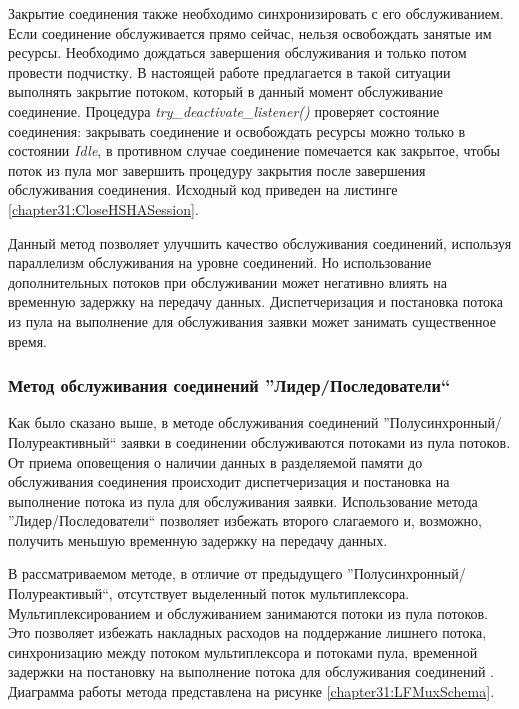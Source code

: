 Закрытие соединения также необходимо синхронизировать с его обслуживанием. Если соединение обслуживается прямо сейчас, нельзя освобождать занятые им ресурсы. Необходимо дождаться завершения обслуживания и только потом провести подчистку. В настоящей работе предлагается в такой ситуации выполнять закрытие потоком, который в данный момент обслуживание соединение. Процедура \textit{try\_deactivate\_listener()} проверяет состояние соединения: закрывать соединение и освобождать ресурсы можно только в состоянии \textit{Idle}, в противном случае соединение помечается как закрытое, чтобы поток из пула мог завершить процедуру закрытия после завершения обслуживания соединения. Исходный код приведен на листинге \ref{chapter31:CloseHSHASession}.

Данный метод позволяет улучшить качество обслуживания соединений, используя параллелизм обслуживания на уровне соединений. Но использование дополнительных потоков при обслуживании может негативно влиять на временную задержку на передачу данных. Диспетчеризация и постановка потока из пула на выполнение для обслуживания заявки может занимать существенное время.

\subsubsection{Метод обслуживания соединений ''Лидер/Последователи``}\label{chapter31:BlockingLF}

Как было сказано выше, в методе обслуживания соединений ''Полусинхронный/Полуреактивный`` заявки в соединении обслуживаются потоками из пула потоков. От приема оповещения о наличии данных в разделяемой памяти до обслуживания соединения происходит диспетчеризация и постановка на выполнение потока из пула для обслуживания заявки. Использование метода ''Лидер/Последователи`` \cite{schmidt1998leader} позволяет избежать второго слагаемого и, возможно, получить меньшую временную задержку на передачу данных.

В рассматриваемом методе, в отличие от предыдущего ''Полусинхронный/Полуреактивый``, отсутствует выделенный поток мультиплексора. Мультиплексированием и обслуживанием занимаются потоки из пула потоков. Это позволяет избежать накладных расходов на поддержание лишнего потока, синхронизацию между потоком мультиплексора и потоками пула, временной задержки на постановку на выполнение потока для обслуживания соединений \cite[41]{POSA2}. Диаграмма работы метода представлена на рисунке \ref{chapter31:LFMuxSchema}.

